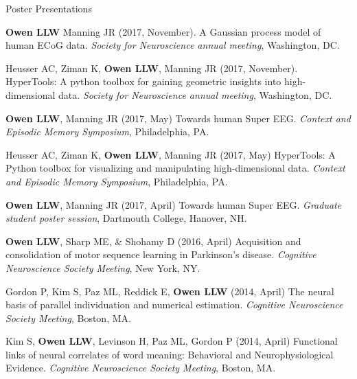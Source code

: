 \documentclass{resume} %
\begin{document}
\begin{rSection}{Poster Presentations} \itemsep -2pt

\item \textbf{Owen LLW} Manning JR (2017, November). A Gaussian process model of
human ECoG data. \textit{Society for Neuroscience annual meeting},
Washington, DC.

\item Heusser AC, Ziman K, \textbf{Owen LLW}, Manning JR (2017, November).
HyperTools: A python toolbox for gaining geometric insights into high-dimensional
data. \textit{Society for Neuroscience annual meeting}, Washington, DC.

\item \textbf{Owen LLW}, Manning JR (2017, May) Towards human Super EEG.
\textit{Context and Episodic Memory Symposium}, Philadelphia, PA.

\item Heusser AC, Ziman K, \textbf{Owen LLW}, Manning JR (2017, May) HyperTools: A Python
toolbox for visualizing and manipulating high-dimensional data. \textit{Context and Episodic Memory Symposium}, Philadelphia, PA.

\item \textbf{Owen LLW}, Manning JR (2017, April) Towards human Super EEG.  \textit{Graduate student poster session}, Dartmouth College, Hanover, NH.

\item \textbf{Owen LLW}, Sharp ME, & Shohamy D (2016, April) Acquisition and consolidation of motor sequence learning in Parkinson’s disease.  \textit{Cognitive Neuroscience
Society Meeting}, New York, NY.

\item Gordon P, Kim S, Paz ML, Reddick E, \textbf{Owen LLW} (2014, April) The neural basis of parallel individuation and numerical estimation.  \textit{Cognitive Neuroscience
Society Meeting}, Boston, MA.

\item  Kim S,  \textbf{Owen LLW}, Levinson H, Paz ML, Gordon P (2014, April) Functional links of neural correlates of word meaning: Behavioral and Neurophysiological Evidence. \textit{Cognitive Neuroscience Society Meeting}, Boston, MA.

\end{rSection}


\end{document}
